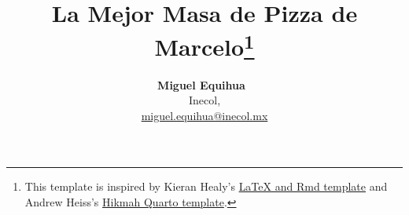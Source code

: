 \documentclass[
  12pt,
  letterpaper,
]{article}
\title{La Mejor Masa de Pizza de Marcelo\thanks{This template is
inspired by Kieran Healy's
\href{https://github.com/kjhealy/latex-custom-kjh}{LaTeX and Rmd
template} and Andrew Heiss's
\href{https://github.com/andrewheiss/hikmah-academic-quarto}{Hikmah
Quarto template}.}}
\author{
{\bfseries \normalsize Miguel Equihua~\orcidlink{0000-0001-5306-7397}}%
 \\%
 \small Inecol,  \\%
{\footnotesize \url{miguel.equihua@inecol.mx}} \\\vspace{10pt}
}
\date{}
\newenvironment{keywords}
{\small\sffamily{\sffamily\small\bfseries{Keywords.}}}
\begin{document}
\renewcommand{\abstractname}{Abstract.}


\maketitle
\begin{abstract}
Nunc ac dignissim magna. Vestibulum vitae egestas elit. Proin feugiat
leo quis ante condimentum, eu ornare mauris feugiat. Pellentesque
habitant morbi tristique senectus et netus et malesuada fames ac turpis
egestas. Mauris cursus laoreet ex, dignissim bibendum est posuere
iaculis. Suspendisse et maximus elit. In fringilla gravida ornare.
Aenean id lectus pulvinar, sagittis felis nec, rutrum risus. Nam vel
neque eu arcu blandit fringilla et in quam. Aliquam luctus est sit amet
vestibulum eleifend. Phasellus elementum sagittis molestie. Proin tempor
lorem arcu, at condimentum purus volutpat eu. Fusce et pellentesque
ligula. Pellentesque id tellus at erat luctus fringilla. Suspendisse
potenti.
\end{abstract}
\begin{keywords}
\def\sep{;\ }
Quarto\sep Typst\sep 
format
\end{keywords}


This document shows a practical usage of the template.

I use the Palmer penguins dataset (Horst, Hill, y Gorman 2020) to
demonstrate the features of the template. The code is available
\href{https://github.com/kazuyanagimoto/quarto-academic-typst}{here}.

\section{Section as Heading Level 1}\label{section-as-heading-level-1}

Section numbering can be specified in the YAML
\texttt{section-numbering} field as other Typst templates.

\subsection{Subsection as Heading Level
2}\label{subsection-as-heading-level-2}

You can use LaTeX math expressions:

\[
Y_{it} = \alpha_i + \lambda_t + \sum_{k \neq -1} \tau_h \{E_i + k = t\} +
\varepsilon_{it}.
\]
\end{document}
